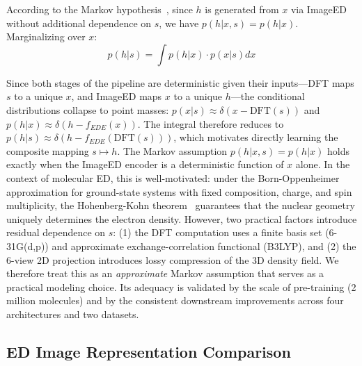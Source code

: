 According to the Markov hypothesis~\cite{markov1960theory}, since $h$ is generated from $x$ via ImageED without additional dependence on $s$, we have $p(h|x,s)=p(h|x)$. Marginalizing over $x$:
\begin{equation}
p(h|s)=\int p(h|x)\cdot p(x|s) dx
\end{equation}

Since both stages of the pipeline are deterministic given their inputs---DFT maps $s$ to a unique $x$, and ImageED maps $x$ to a unique $h$---the conditional distributions collapse to point masses: $p(x|s)\approx\delta(x - \text{DFT}(s))$ and $p(h|x)\approx\delta(h - f_{EDE}(x))$. The integral therefore reduces to $p(h|s)\approx\delta(h - f_{EDE}(\text{DFT}(s)))$, which motivates directly learning the composite mapping $s\mapsto h$. The Markov assumption $p(h|x,s)=p(h|x)$ holds exactly when the ImageED encoder is a deterministic function of $x$ alone. In the context of molecular ED, this is well-motivated: under the Born-Oppenheimer approximation for ground-state systems with fixed composition, charge, and spin multiplicity, the Hohenberg-Kohn theorem~\cite{hohenberg1964inhomogeneous} guarantees that the nuclear geometry uniquely determines the electron density. However, two practical factors introduce residual dependence on $s$: (1) the DFT computation uses a finite basis set (6-31G(d,p)) and approximate exchange-correlation functional (B3LYP), and (2) the 6-view 2D projection introduces lossy compression of the 3D density field. We therefore treat this as an \emph{approximate} Markov assumption that serves as a practical modeling choice. Its adequacy is validated by the scale of pre-training (2 million molecules) and by the consistent downstream improvements across four architectures and two datasets.


\subsection{ED Image Representation Comparison}
\label{sec:appendix_ed_repr}

